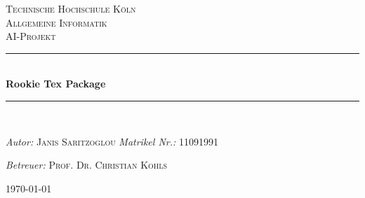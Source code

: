 \begin{titlepage}
\newcommand{\HRule}{\rule{\linewidth}{0.5mm}}
\center
\textsc{\LARGE Technische Hochschule Köln} \\[1.5cm]
\textsc{\Large Allgemeine Informatik} \\[0.5cm]
\textsc{\large AI-Projekt} \\
\HRule  \\[0.4cm]
{ \huge \bfseries Rookie Tex Package} \\[0.4cm]
\HRule  \\[1.5cm]
\begin{minipage}[t]{0.4\textwidth}
    \begin{flushleft} \large
        \emph{Autor:} \newline
        \textsc{Janis Saritzoglou}
        \emph{Matrikel Nr.:}
        \textsc{11091991}
    \end{flushleft}
\end{minipage}
\hfill
\begin{minipage}[t]{0.5\textwidth}
    \begin{flushright} \large
        \emph{Betreuer:} \newline
        \textsc{Prof. Dr. Christian Kohls}
    \end{flushright}
\end{minipage}
\vfill
{\large \today}
\end{titlepage}
